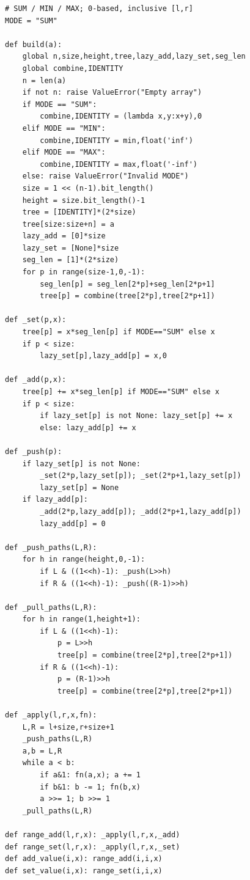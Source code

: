 \documentclass[9pt,a4paper]{extarticle}
\begin{document}
\begin{minipage}[t]{\textwidth}
\begin{minipage}[t]{0.493\linewidth}
\vspace{0pt}

\begin{lstlisting}
# SUM / MIN / MAX; 0-based, inclusive [l,r]
MODE = "SUM"

def build(a):
    global n,size,height,tree,lazy_add,lazy_set,seg_len
    global combine,IDENTITY
    n = len(a)
    if not n: raise ValueError("Empty array")
    if MODE == "SUM":
        combine,IDENTITY = (lambda x,y:x+y),0
    elif MODE == "MIN":
        combine,IDENTITY = min,float('inf')
    elif MODE == "MAX":
        combine,IDENTITY = max,float('-inf')
    else: raise ValueError("Invalid MODE")
    size = 1 << (n-1).bit_length()
    height = size.bit_length()-1
    tree = [IDENTITY]*(2*size)
    tree[size:size+n] = a
    lazy_add = [0]*size
    lazy_set = [None]*size
    seg_len = [1]*(2*size)
    for p in range(size-1,0,-1):
        seg_len[p] = seg_len[2*p]+seg_len[2*p+1]
        tree[p] = combine(tree[2*p],tree[2*p+1])

def _set(p,x):
    tree[p] = x*seg_len[p] if MODE=="SUM" else x
    if p < size:
        lazy_set[p],lazy_add[p] = x,0

def _add(p,x):
    tree[p] += x*seg_len[p] if MODE=="SUM" else x
    if p < size:
        if lazy_set[p] is not None: lazy_set[p] += x
        else: lazy_add[p] += x

def _push(p):
    if lazy_set[p] is not None:
        _set(2*p,lazy_set[p]); _set(2*p+1,lazy_set[p])
        lazy_set[p] = None
    if lazy_add[p]:
        _add(2*p,lazy_add[p]); _add(2*p+1,lazy_add[p])
        lazy_add[p] = 0

def _push_paths(L,R):
    for h in range(height,0,-1):
        if L & ((1<<h)-1): _push(L>>h)
        if R & ((1<<h)-1): _push((R-1)>>h)

def _pull_paths(L,R):
    for h in range(1,height+1):
        if L & ((1<<h)-1):
            p = L>>h
            tree[p] = combine(tree[2*p],tree[2*p+1])
        if R & ((1<<h)-1):
            p = (R-1)>>h
            tree[p] = combine(tree[2*p],tree[2*p+1])

def _apply(l,r,x,fn):
    L,R = l+size,r+size+1
    _push_paths(L,R)
    a,b = L,R
    while a < b:
        if a&1: fn(a,x); a += 1
        if b&1: b -= 1; fn(b,x)
        a >>= 1; b >>= 1
    _pull_paths(L,R)

def range_add(l,r,x): _apply(l,r,x,_add)
def range_set(l,r,x): _apply(l,r,x,_set)
def add_value(i,x): range_add(i,i,x)
def set_value(i,x): range_set(i,i,x)


\end{lstlisting}
\end{minipage}
\end{minipage}
\end{document}
